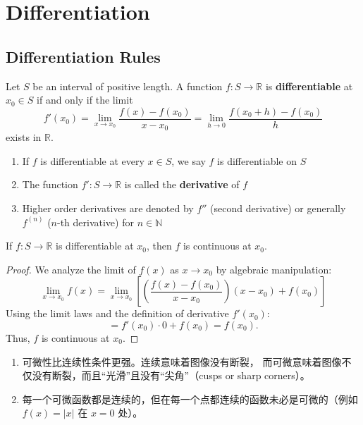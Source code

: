 \documentclass[
	UTF-8,
	11pt, %
	a4paper, %
]{LegrandOrangeBook}
\begin{document}
    \newpage

    \chapter{Differentiation}

    \section{Differentiation Rules}

    \begin{definition}[Differentiability]
    Let $S$ be an interval of positive length. A function $f: S \to \mathbb{R}$ is \textbf{differentiable} at $x_0 \in S$ if and only if the limit
    \[ f'(x_0) = \lim_{x \to x_0} \frac{f(x) - f(x_0)}{x - x_0} = \lim_{h \to 0} \frac{f(x_0 + h) - f(x_0)}{h} \]
    exists in $\mathbb{R}$.
    \begin{enumerate}
        \item If $f$ is differentiable at every $x \in S$, we say $f$ is differentiable on $S$
        \item The function $f': S \to \mathbb{R}$ is called the \textbf{derivative} of $f$
        \item Higher order derivatives are denoted by $f''$ (second derivative) 
        or generally $f^{(n)}$ ($n$-th derivative) for $n \in \mathbb{N}$
    \end{enumerate}
    \end{definition}

    \begin{theorem}
    If $f: S \to \mathbb{R}$ is differentiable at $x_0$, then $f$ is continuous at $x_0$.
    \end{theorem}

    \begin{proof}
    We analyze the limit of $f(x)$ as $x \to x_0$ by algebraic manipulation:
    \[ \lim_{x \to x_0} f(x) = \lim_{x \to x_0} \left[ \left( \frac{f(x) - f(x_0)}{x - x_0} \right) (x - x_0) + f(x_0) \right] \]
    Using the limit laws and the definition of derivative $f'(x_0)$:
    \[ = f'(x_0) \cdot 0 + f(x_0) = f(x_0). \]
    Thus, $f$ is continuous at $x_0$.
    \end{proof}

    \begin{remark}\quad
    \begin{enumerate}
        \item 可微性比连续性条件更强。连续意味着图像没有断裂，
        而可微意味着图像不仅没有断裂，而且“光滑”且没有“尖角”（cusps or sharp corners）。
        \item 每一个可微函数都是连续的，但在每一个点都连续的函数未必是可微的（例如 $f(x) = |x|$ 在 $x=0$ 处）。
    \end{enumerate}
    \end{remark}
\end{document}
